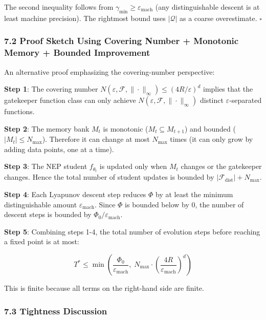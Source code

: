 \documentclass[
  12pt,
]{article}
\begin{document}
The second inequality follows from
\(\gamma_{\min} \geq \varepsilon_{\text{mach}}\) (any distinguishable
descent is at least machine precision). The rightmost bound uses
\(|\mathcal{Q}|\) as a coarse overestimate. \(\square\)

\subsubsection{7.2 Proof Sketch Using Covering Number + Monotonic Memory
+ Bounded
Improvement}\label{proof-sketch-using-covering-number-monotonic-memory-bounded-improvement}

An alternative proof emphasizing the covering-number perspective:

\textbf{Step 1}: The covering number
\(N(\varepsilon, \mathcal{F}, \|\cdot\|_\infty) \leq (4R/\varepsilon)^d\)
implies that the gatekeeper function class can only achieve
\(N(\varepsilon, \mathcal{F}, \|\cdot\|_\infty)\) distinct
\(\varepsilon\)-separated functions.

\textbf{Step 2}: The memory bank \(M_t\) is monotonic
(\(M_t \subseteq M_{t+1}\)) and bounded (\(|M_t| \leq N_{\text{max}}\)).
Therefore it can change at most \(N_{\text{max}}\) times (it can only
grow by adding data points, one at a time).

\textbf{Step 3}: The NEP student \(f_{\theta_t}\) is updated only when
\(M_t\) changes or the gatekeeper changes. Hence the total number of
student updates is bounded by
\(|\mathcal{F}_{\text{dist}}| + N_{\text{max}}\).

\textbf{Step 4}: Each Lyapunov descent step reduces \(\Phi\) by at least
the minimum distinguishable amount \(\varepsilon_{\text{mach}}\). Since
\(\Phi\) is bounded below by \(0\), the number of descent steps is
bounded by \(\Phi_0/\varepsilon_{\text{mach}}\).

\textbf{Step 5}: Combining steps 1-4, the total number of evolution
steps before reaching a fixed point is at most:

\[T^* \leq \min\left( \frac{\Phi_0}{\varepsilon_{\text{mach}}}, \; N_{\text{max}} \cdot \left( \frac{4R}{\varepsilon_{\text{mach}}} \right)^d \right)\]

This is finite because all terms on the right-hand side are finite.

\subsubsection{7.3 Tightness Discussion}\label{tightness-discussion}
\end{document}
